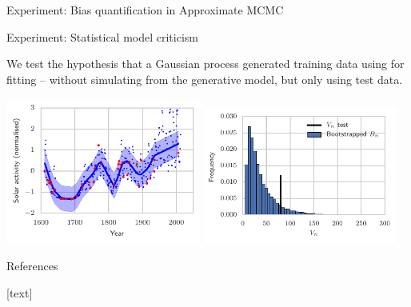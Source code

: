 \begin{frame}
\begin{columns}
\begin{column}{.32\linewidth}
\begin{block}{Experiment: Bias quantification in Approximate MCMC}
\begin{minipage}{.35\linewidth}
\end{minipage}
\end{block}
\vspace{-0.75cm}
\begin{block}{Experiment: Statistical model criticism}
\begin{center}
\item We test the hypothesis that a Gaussian process generated {\color{red}training data} using for fitting -- without simulating from the generative model, but only using {\color{blue} test data}.
\end{center}
\includegraphics[width=0.48\textwidth]{../../presentation/img/gp_regression_data_fit.pdf} \includegraphics[width=0.48\textwidth]{../../presentation/img/gp_regression_bootstrap_hist} 
\begin{minipage}{.35\linewidth}

\end{minipage}
\end{block}
\vspace{-0.75cm}
\begin{block}{References}
\begin{minipage}{.9\linewidth}
{\footnotesize
\begin{multicols}{2}
[text] 
 
\scriptsize
 \ 
\end{multicols}
} 
\end{minipage}
\end{block}

\end{column}
\end{columns}

\end{frame}

